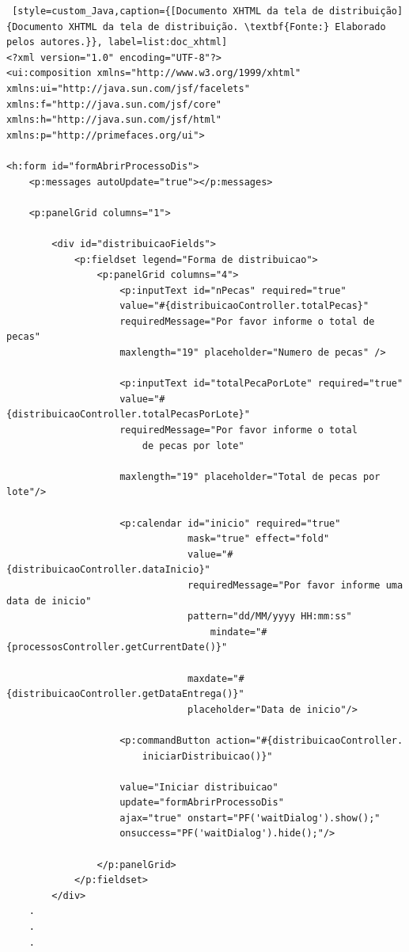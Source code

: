 \begin{lstlisting} [style=custom_Java,caption={[Documento XHTML da tela de distribuição]{Documento XHTML da tela de distribuição. \textbf{Fonte:} Elaborado pelos autores.}}, label=list:doc_xhtml] 
<?xml version="1.0" encoding="UTF-8"?>
<ui:composition xmlns="http://www.w3.org/1999/xhtml"
xmlns:ui="http://java.sun.com/jsf/facelets"
xmlns:f="http://java.sun.com/jsf/core"
xmlns:h="http://java.sun.com/jsf/html"
xmlns:p="http://primefaces.org/ui">

<h:form id="formAbrirProcessoDis">
	<p:messages autoUpdate="true"></p:messages>
	
	<p:panelGrid columns="1">
	
		<div id="distribuicaoFields">
			<p:fieldset legend="Forma de distribuicao">
				<p:panelGrid columns="4">
					<p:inputText id="nPecas" required="true" 
					value="#{distribuicaoController.totalPecas}"
					requiredMessage="Por favor informe o total de pecas" 
					maxlength="19" placeholder="Numero de pecas" />
					
					<p:inputText id="totalPecaPorLote" required="true"
					value="#{distribuicaoController.totalPecasPorLote}"
					requiredMessage="Por favor informe o total 
						de pecas por lote"
						
					maxlength="19" placeholder="Total de pecas por lote"/>
					
					<p:calendar id="inicio" required="true"
								mask="true" effect="fold"
								value="#{distribuicaoController.dataInicio}"
								requiredMessage="Por favor informe uma data de inicio" 
								pattern="dd/MM/yyyy HH:mm:ss" 
									mindate="#{processosController.getCurrentDate()}"
					
								maxdate="#{distribuicaoController.getDataEntrega()}"
								placeholder="Data de inicio"/>
					
					<p:commandButton action="#{distribuicaoController.
						iniciarDistribuicao()}"
					
					value="Iniciar distribuicao" 
					update="formAbrirProcessoDis"
					ajax="true" onstart="PF('waitDialog').show();"
					onsuccess="PF('waitDialog').hide();"/>
				
				</p:panelGrid>
			</p:fieldset>
		</div>
	.
	.
	.

\end{lstlisting}


